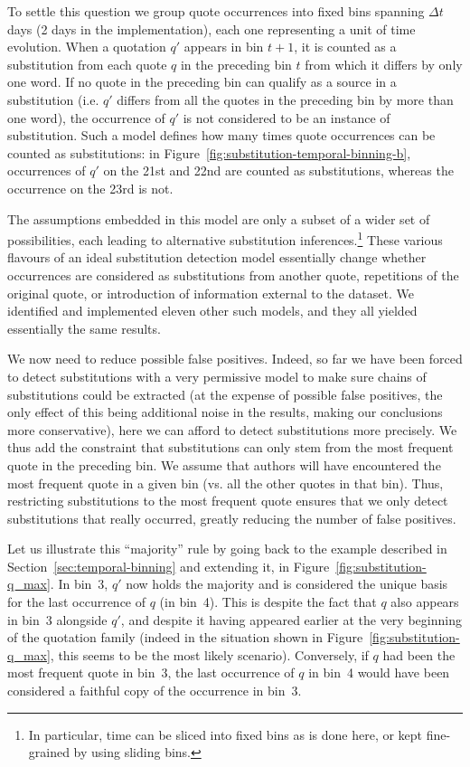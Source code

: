 To settle this question we group quote occurrences into fixed bins spanning $\Delta t$ days (2 days in the implementation), each one representing a unit of time evolution.
When a quotation $q'$ appears in bin $t+1$, it is counted as a substitution from each quote $q$ in the preceding bin $t$ from which it differs by only one word.
If no quote in the preceding bin can qualify as a source in a substitution (i.e. $q'$ differs from all the quotes in the preceding bin by more than one word), the occurrence of $q'$ is not considered to be an instance of substitution.
Such a model defines how many times quote occurrences can be counted as substitutions: in Figure~\ref{fig:substitution-temporal-binning-b}, occurrences of $q'$ on the 21st and 22nd are counted as substitutions, whereas the occurrence on the 23rd is not.

The assumptions embedded in this model are only a subset of a wider set of possibilities, each leading to alternative substitution inferences.\footnote{In particular, time can be sliced into fixed bins as is done here, or kept fine-grained by using sliding bins.}
These various flavours of an ideal substitution detection model essentially change whether occurrences are considered as substitutions from another quote, repetitions of the original quote, or introduction of information external to the dataset.
We identified and implemented eleven other such models, and they all yielded essentially the same results.

We now need to reduce possible false positives.
Indeed, so far we have been forced to detect substitutions with a very permissive model to make sure chains of substitutions could be extracted (at the expense of possible false positives, the only effect of this being additional noise in the results, making our conclusions more conservative), here we can afford to detect substitutions more precisely.
We thus add the constraint that substitutions can only stem from the most frequent quote in the preceding bin.
We assume that authors will have encountered the most frequent quote in a given bin (\hbox{vs.} all the other quotes in that bin). Thus, restricting substitutions to the most frequent quote ensures that we only detect substitutions that really occurred, greatly reducing the number of false positives.

Let us illustrate this ``majority'' rule by going back to the example described in Section~\ref{sec:temporal-binning} and extending it, in Figure~\ref{fig:substitution-q_max}.
In bin~3, $q'$ now holds the majority and is considered the unique basis for the last occurrence of $q$ (in bin~4).
This is despite the fact that $q$ also appears in bin~3 alongside $q'$, and despite it having appeared earlier at the very beginning of the quotation family (indeed in the situation shown in Figure~\ref{fig:substitution-q_max}, this seems to be the most likely scenario).
Conversely, if $q$ had been the most frequent quote in bin~3, the last occurrence of $q$ in bin~4 would have been considered a faithful copy of the occurrence in bin~3.


